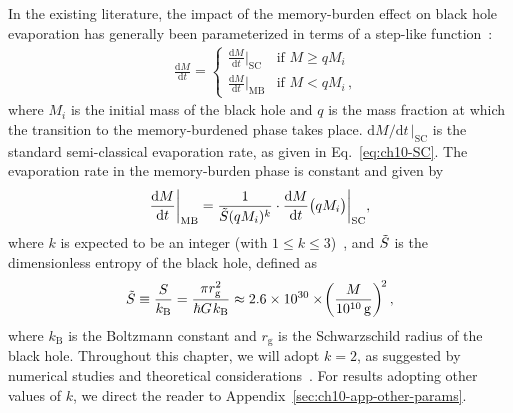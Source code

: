 In the existing literature, the impact of the memory-burden effect on black hole evaporation has generally been parameterized in terms of a step-like function~\cite{Dvali:2020wft, Alexandre:2024nuo, Dvali:2024hsb}:
%
\begin{align}
    &\qquad
        \frac{\mathrm{d}M}{\mathrm{d}t} =
        \begin{cases}
            \displaystyle\frac{\mathrm{d} M}{\mathrm{d} t}\Big|_\mathrm{SC}
                & \text{if } M \geq q M_{i}\\[1mm]
            \displaystyle\frac{\mathrm{d} M}{\mathrm{d} t}\Big|_\mathrm{MB}
                & \text{if } M < q M_{i}\, ,
        \end{cases} \quad &
\label{eq:ch10-stepMB}
\end{align}
%
where $M_{i}$ is the initial mass of the black hole and $q$ is the mass fraction at which the transition to the memory-burdened phase takes place. $\mathrm{d}M/\mathrm{d}t\,|_\mathrm{SC}$ is the standard semi-classical evaporation rate, as given in Eq.~\eqref{eq:ch10-SC}. The evaporation rate in the memory-burden phase is constant and given by
%
\begin{align}
    \frac{\mathrm{d}M}{\mathrm{d}t}\bigg|_\mathrm{MB}
        =
            \frac{1}{\Tilde{S}(q M_{i})^k} \cdot
            \frac{\mathrm{d}M}{\mathrm{d}t} \big(qM_{i}\big)\bigg|_\mathrm{SC},
\label{eq:ch10-MB}
\end{align}
%
where $k$ is expected to be an integer (with $1\leq k \leq 3$)~\cite{Dvali:2024hsb}, and $\Tilde{S}$ is the dimensionless entropy of the black hole, defined as~\cite{Bekenstein:1973ur}
%
\begin{equation}
\label{eq:ch10-entropy}
    \Tilde{S}
        \equiv
            \frac{S}{k_\mathrm{B}}
        =
            \frac{\pi r_\mathrm{g}^{2}}{\hbar G\mspace{1.5mu}k_\mathrm{B}}
        \approx
            2.6\times 10^{30} \times \!\left(\frac{M}{10^{10}\,\mathrm{g}}\right)^{\!2}
            ,
\end{equation}
%
where $k_\mathrm{B}$ is the Boltzmann constant and $r_\mathrm{g}$ is the Schwarzschild radius of the black hole. Throughout this chapter, we will adopt $k=2$,
as suggested by numerical studies and theoretical considerations~\cite{Dvali:2020wft,Dvali:2024hsb,Dvali:2017nis}.
For results adopting other values of $k$, we direct the reader to Appendix~\ref{sec:ch10-app-other-params}.

